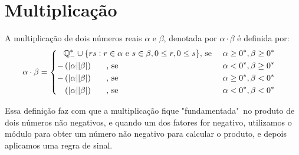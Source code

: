 \documentclass[../main.tex]{subfiles}
\begin{document}
\section{Multiplicação}
\begin{defi}\label{reais-def-produto}
    A multiplicação de dois números reais $\alpha$ e $\beta$, denotada por $\alpha \cdot \beta$ é definida por:
    \begin{equation*}
         \alpha \cdot \beta = 
        \begin{cases}
        \begin{aligned}
            & \mathbb{Q}^*_{-} \cup \{ rs : r \in \alpha \text{ e } s \in \beta, 0 \leq r, 0 \leq s \} \text{, se } & \alpha \geq 0^*, \beta \geq 0^*  \\
            - & \left(\abs{\alpha}\abs{\beta}\right) \hspace{0.6cm} \text{, se } & \alpha < 0^*, \beta \geq 0^* \\
            - & \left(\abs{\alpha}\abs{\beta}\right) \hspace{0.6cm} \text{, se } & \alpha \geq 0^*, \beta < 0^* \\
              & \left(\abs{\alpha}\abs{\beta}\right) \hspace{0.6cm} \text{, se } & \alpha < 0^*, \beta < 0^*
        \end{aligned}
        \end{cases}
    \end{equation*}
\end{defi}
Essa definição faz com que a multiplicação fique "fundamentada"\ no produto de dois números não negativos, e quando um dos fatores for negativo, utilizamos o módulo para obter um número não negativo para calcular o produto, e depois aplicamos uma regra de sinal.
\end{document}
